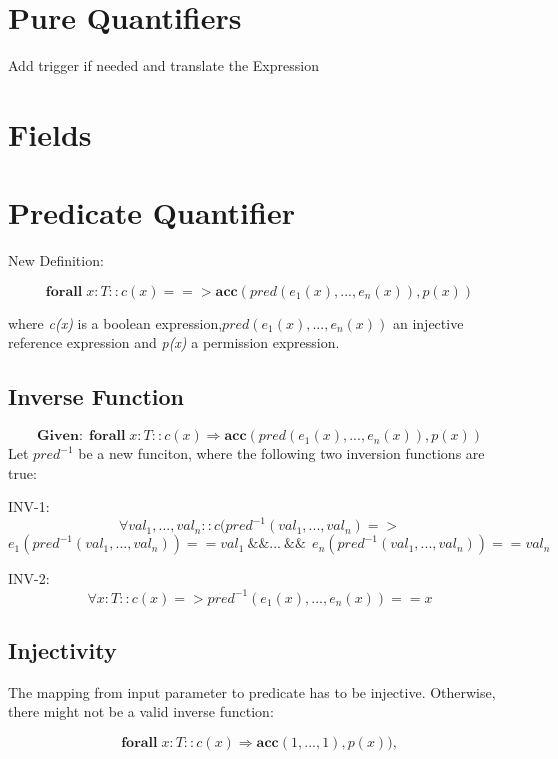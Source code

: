 \documentclass[12pt]{article}
\begin{document}
\maketitle
\section{Pure Quantifiers}
Add trigger if needed and translate the Expression
\section{Fields}
\section{Predicate Quantifier}
New Definition:

\begin{equation}
	\mathbf{forall} \; x:T :: c(x) ==>\mathbf{acc}( pred(e_1(x), ... ,e_n(x)), p(x) )
\end{equation}

where {\it c(x)} is  a boolean expression,$pred(e_1(x), ... ,e_n(x))$ an injective reference expression and {\it p(x)} a permission expression.

\subsection{Inverse Function}

\[ \mathbf{Given: \; } \mathbf{forall} \; x:T :: c(x) \Rightarrow \mathbf{acc}( pred(e_1(x), ... ,e_n(x)), p(x) )   \]
Let  $pred^{- 1}$ be a new funciton, where the following two inversion functions are true:

INV-1:
\[ \forall val_1, ..., val_n :: c(pred^{-1} (val_1, ..., val_n) => \]
\[ e_1 (pred^{-1} (val_1, ..., val_n)) == val_1 \: \&\&  ... \: \&\&  \:\: e_n(pred^{-1} (val_1, ..., val_n)) == val_n\]


INV-2:
\[ \forall x:T :: c(x) => pred^{-1}(e_1(x), ..., e_n(x)) == x\]

\subsection{Injectivity}
The mapping from input parameter to predicate has to be injective. Otherwise, there might not be a valid inverse function:


\begin{equation}
	\mathbf{forall} \; x:T :: c(x) \Rightarrow \mathbf{acc}( 1, ... ,1), p(x) ) ,
\end{equation}
\end{document}
